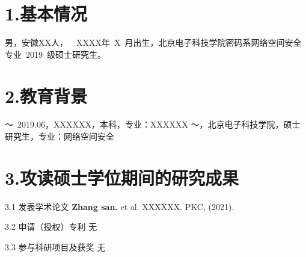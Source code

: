 
\begin{resume}

\section*{1.\hspace{0.75em}基本情况}
男，安徽XX人，~~XXXX年~X~月出生，北京电子科技学院密码系网络空间安全专业~2019~级硕士研究生。
\section*{2.\hspace{0.75em}教育背景}
\begin{resumelist*}
～~2019.06，XXXXXX，本科，专业：XXXXXX
～\hspace{3.5em}，北京电子科技学院，硕士研究生，专业：网络空间安全
\end{resumelist*}

\section*{3.\hspace{0.75em}攻读硕士学位期间的研究成果}
\begin{resumelist}{\hspace{-0.25em}3.1\hspace{0.5em} 发表学术论文}
\resumelistitem \textbf{Zhang san.} et al. XXXXXX. PKC, (2021). 
\end{resumelist}

\begin{resumelist}{\hspace{-0.25em}3.2\hspace{0.5em} 申请（授权）专利}
\resumelistitem 无
\end{resumelist}

\begin{resumelist}{\hspace{-0.25em}3.3\hspace{0.5em} 参与科研项目及获奖}
\resumelistitem 无
\end{resumelist}
\end{resume}
